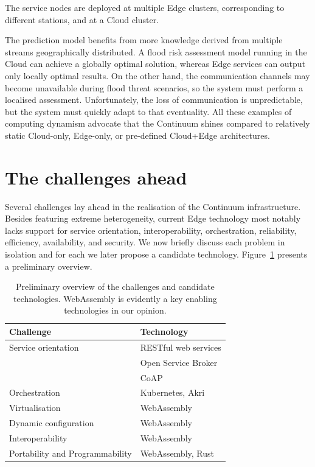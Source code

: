 The service nodes are deployed at multiple Edge clusters, corresponding to different stations, and at a Cloud cluster.


The prediction model benefits from more knowledge derived from multiple streams geographically distributed. A flood risk assessment model running in the Cloud can achieve a globally optimal solution, whereas Edge services can output only locally optimal results. On the other hand, the communication channels may become unavailable during flood threat scenarios, so the system must perform a localised assessment. Unfortunately, the loss of communication is unpredictable, but the system must quickly adapt to that eventuality. All these examples of computing dynamism advocate that the Continuum shines compared to relatively static Cloud-only, Edge-only, or pre-defined Cloud+Edge architectures.

\section{The challenges ahead}
\label{sec:challenges}

Several challenges lay ahead in the realisation of the Continuum infrastructure. Besides featuring extreme heterogeneity, current Edge technology most notably lacks support for service orientation, interoperability, orchestration, reliability, efficiency, availability, and security. We now briefly discuss each problem in isolation and for each we later propose a candidate technology. Figure~\ref{fig:challenges-technologies} presents a preliminary overview.

\begin{table}
  \caption{Preliminary overview of the challenges and candidate technologies. WebAssembly is evidently a key enabling technologies in our opinion.}  \label{fig:challenges-technologies}
  \begin{tabular*}{\textwidth}{ | l | l }
   \toprule
    \textbf{Challenge} & \textbf{Technology} \\
   \midrule
    Service orientation & RESTful web services \\
    & Open Service Broker \\
    & CoAP \\
    \midrule
    Orchestration & Kubernetes, Akri \\
    Virtualisation & WebAssembly \\
    Dynamic configuration & WebAssembly \\
    Interoperability & WebAssembly \\
    Portability and Programmability & WebAssembly, Rust \\
   \bottomrule
  \end{tabular*}
\end{table}


